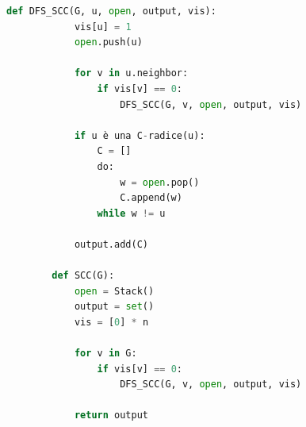 \documentclass[12pt]{report}
\begin{document}
	\begin{lstlisting}[style=stile-listings, language=Python, caption={Propotipo di algoritmi efficiente per la ricerca delle componenti fortemente connesse}]
		def DFS_SCC(G, u, open, output, vis):
			vis[u] = 1
			open.push(u)
			
			for v in u.neighbor:
				if vis[v] == 0:
					DFS_SCC(G, v, open, output, vis)
			
			if u è una C-radice(u):
				C = []
				do:
					w = open.pop()
					C.append(w)
				while w != u
			
			output.add(C)
			
		def SCC(G):
			open = Stack()
			output = set()
			vis = [0] * n
			
			for v in G:
				if vis[v] == 0:
					DFS_SCC(G, v, open, output, vis)
			
			return output
	\end{lstlisting}
	
\end{document}
